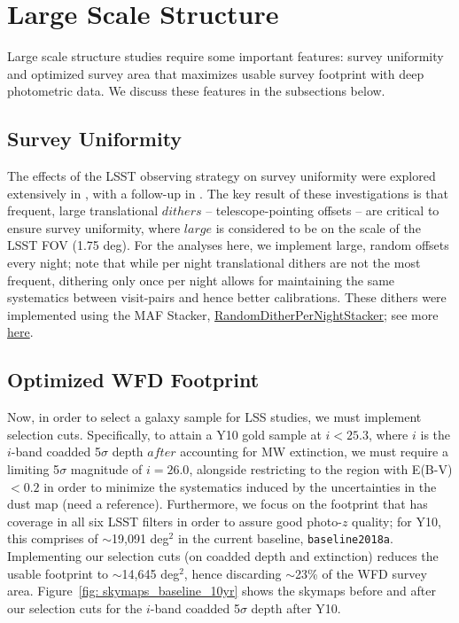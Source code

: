 \newcommand{\ttt}[1]{\texttt{#1}}

\section{Large Scale Structure}
Large scale structure studies require some important features: survey uniformity and optimized survey area that maximizes usable survey footprint with deep photometric data.  We discuss these features in the subsections below.
\subsection{Survey Uniformity}
The effects of the LSST observing strategy on survey uniformity were explored extensively in \citet{Awan+2016}, with a follow-up in \citet[Section 9.2]{Marshall:2017wph}. The key result of these investigations is that frequent, large translational $dithers$ -- telescope-pointing offsets -- are critical to ensure survey uniformity, where $large$ is considered to be on the scale of the LSST FOV (1.75 deg). For the analyses here, we implement large, random offsets every night; note that while per night translational dithers are not the most frequent, dithering only once per night allows for maintaining the same systematics between visit-pairs and hence better calibrations. These dithers were implemented using the MAF Stacker, \href{https://github.com/lsst/sims_maf/blob/97988f6bc30c216fffb41e6da0a7d201e919b9ca/python/lsst/sims/maf/stackers/ditherStackers.py#L371}{RandomDitherPerNightStacker}; see more \href{https://github.com/LSSTDESC/ObsStrat/tree/issue/3/desc-dithers}{here}.

\subsection{Optimized WFD Footprint}
Now, in order to select a galaxy sample for LSS studies, we must implement selection cuts. Specifically, to attain a Y10 gold sample at $i<25.3$, where $i$ is the $i$-band coadded 5$\sigma$ depth $after$ accounting for MW extinction, we must require a limiting 5$\sigma$ magnitude of $i=26.0$, alongside restricting to the region with E(B-V) $<0.2$ in order to minimize the systematics induced by the uncertainties in the dust map (need a reference). Furthermore, we focus on the footprint that has coverage in all six LSST filters in order to assure good photo-$z$ quality; for Y10, this comprises of $\sim$19,091 deg$^2$ in the current baseline, \ttt{baseline2018a}. Implementing our selection cuts (on coadded depth and extinction) reduces the usable footprint to $\sim$14,645 deg$^2$, hence discarding  $\sim$23\% of the WFD survey area. Figure~\ref{fig: skymaps_baseline_10yr} shows the skymaps before and after our selection cuts for the $i$-band coadded 5$\sigma$ depth after Y10.


